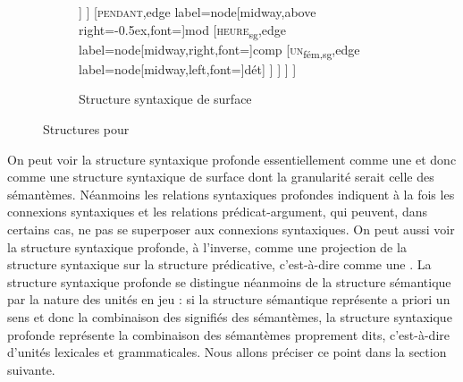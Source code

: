 \begin{figure}
\begin{subfigure}[b]{0.5\textwidth}
\begin{forest}
						[\textsc{prof}\textsubscript{sg},edge label={node[midway,right,font=\footnotesize]{comp}}
							[\textsc{le}\textsubscript{fém,sg},edge label={node[midway,left,font=\footnotesize]{dét}}]
						]
					]
					[\textsc{pendant},edge label={node[midway,above right=-0.5ex,font=\footnotesize]{mod}}
						[\textsc{heure}\textsubscript{sg},edge label={node[midway,right,font=\footnotesize]{comp}}
							[\textsc{un}\textsubscript{fém,sg},edge label={node[midway,left,font=\footnotesize]{dét}}]
						]
					]
				]
			]
		\end{forest}
		\caption{Structure syntaxique de surface}
	\end{subfigure}
\caption{Structures pour \label{fig:jambe}}
\end{figure}

On peut voir la structure syntaxique profonde essentiellement comme une  et donc comme une structure syntaxique de surface dont la granularité serait celle des sémantèmes. Néanmoins les relations syntaxiques profondes indiquent à la fois les connexions syntaxiques et les relations prédicat-argument, qui peuvent, dans certains cas, ne pas se superposer aux connexions syntaxiques.
On peut aussi voir la structure syntaxique profonde, à l’inverse, comme une projection de la structure syntaxique sur la structure prédicative, c’est-à-dire comme une . La structure syntaxique profonde se distingue néanmoins de la structure sémantique par la nature des unités en jeu : si la structure sémantique représente a priori un sens et donc la combinaison des signifiés des sémantèmes, la structure syntaxique profonde représente la combinaison des sémantèmes proprement dits, c’est-à-dire d’unités lexicales et grammaticales. Nous allons préciser ce point dans la section suivante.

